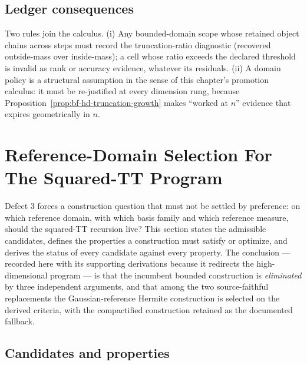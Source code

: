 \subsection{Ledger consequences}

Two rules join the calculus.  (i) Any bounded-domain scope whose retained
object chains across steps must record the truncation-ratio diagnostic
(recovered outside-mass over inside-mass); a cell whose ratio exceeds the
declared threshold is invalid as rank or accuracy evidence, whatever its
residuals.  (ii) A domain policy is a structural assumption in the sense
of this chapter's promotion calculus: it must be re-justified at every
dimension rung, because Proposition~\ref{prop:bf-hd-truncation-growth}
makes ``worked at \(n\)'' evidence that expires geometrically in \(n\).

\section[Reference-Domain Selection]{Reference-Domain Selection For The Squared-TT Program}
\label{sec:bf-hd-refdom}

Defect 3 forces a construction question that must not be settled by
preference: on which reference domain, with which basis family and which
reference measure, should the squared-TT recursion live?  This section
states the admissible candidates, defines the properties a construction
must satisfy or optimize, and derives the status of every candidate
against every property.  The conclusion --- recorded here with its
supporting derivations because it redirects the high-dimensional program
--- is that the incumbent bounded construction is \emph{eliminated} by
three independent arguments, and that among the two source-faithful
replacements the Gaussian-reference Hermite construction is selected on
the derived criteria, with the compactified construction retained as the
documented fallback.

\subsection{Candidates and properties}

